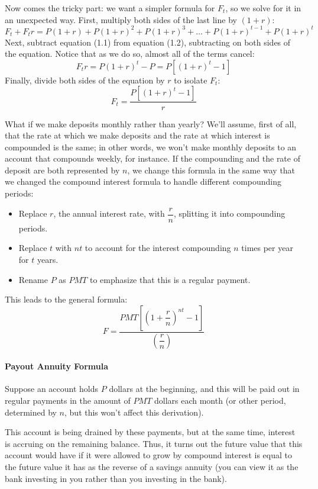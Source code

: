Now comes the tricky part: we want a simpler formula for $F_t$, so we solve for it in an unexpected way.  First, multiply both sides of the last line by $(1+r)$:
\begin{equation}
F_t + F_tr = P(1+r) + P(1+r)^2 + P(1+r)^3 + \ldots + P(1+r)^{t-1} + P(1+r)^t
\end{equation}
Next, subtract equation (1.1) from equation (1.2), subtracting on both sides of the equation.  Notice that as we do so, almost all of the terms cancel:
\[F_tr = P(1+r)^t-P = P\left[(1+r)^t-1\right]\]
Finally, divide both sides of the equation by $r$ to isolate $F_t$:
\[F_t = \dfrac{P\left[(1+r)^t-1\right]}{r}\]

What if we make deposits monthly rather than yearly?  We'll assume, first of all, that the rate at which we make deposits and the rate at which interest is compounded is the same; in other words, we won't make monthly deposits to an account that compounds weekly, for instance.  If the compounding and the rate of deposit are both represented by $n$, we change this formula in the same way that we changed the compound interest formula to handle different compounding periods:
\begin{itemize}
\item Replace $r$, the annual interest rate, with $\dfrac{r}{n}$, splitting it into compounding periods.
\item Replace $t$ with $nt$ to account for the interest compounding $n$ times per year for $t$ years.
\item Rename $P$ as $PMT$ to emphasize that this is a regular payment.
\end{itemize}
This leads to the general formula:
\[\boxed{F=\dfrac{PMT\left[\left(1+\dfrac{r}{n}\right)^{nt}-1\right]}{\left(\dfrac{r}{n}\right)}}\]

\paragraph{Payout Annuity Formula}
Suppose an account holds $P$ dollars at the beginning, and this will be paid out in regular payments in the amount of $PMT$ dollars each month (or other period, determined by $n$, but this won't affect this derivation).

This account is being drained by these payments, but at the same time, interest is accruing on the remaining balance.  Thus, it turns out the future value that this account would have if it were allowed to grow by compound interest is equal to the future value it has as the reverse of a savings annuity (you can view it as the bank investing in you rather than you investing in the bank).

